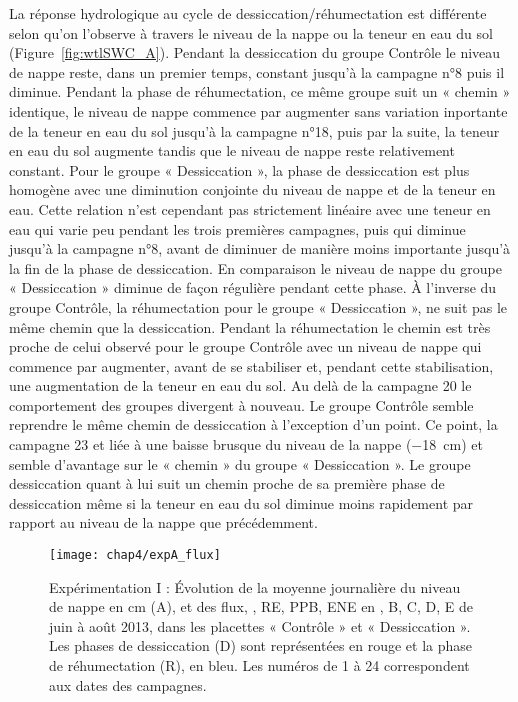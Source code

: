 La réponse hydrologique au cycle de dessiccation/réhumectation est différente selon qu'on l'observe à travers le niveau de la nappe ou la teneur en eau du sol (Figure~\ref{fig:wtlSWC_A}).
Pendant la dessiccation du groupe Contrôle le niveau de nappe reste, dans un premier temps, constant jusqu'à la campagne n°8 puis il diminue. 
Pendant la phase de réhumectation, ce même groupe suit un « chemin » identique, le niveau de nappe commence par augmenter sans variation inportante de la teneur en eau du sol jusqu'à la campagne n°18, puis par la suite, la teneur en eau du sol augmente tandis que le niveau de nappe reste relativement constant.
Pour le groupe « Dessiccation », la phase de dessiccation est plus homogène avec une diminution conjointe du niveau de nappe et de la teneur en eau.
Cette relation n'est cependant pas strictement linéaire avec une teneur en eau qui varie peu pendant les trois premières campagnes, puis qui diminue jusqu'à la campagne n°8, avant de diminuer de manière moins importante jusqu'à la fin de la phase de dessiccation.
En comparaison le niveau de nappe du groupe « Dessiccation » diminue de façon régulière pendant cette phase.
À l'inverse du groupe Contrôle, la réhumectation pour le groupe « Dessiccation », ne suit pas le même chemin que la dessiccation.
Pendant la réhumectation le chemin est très proche de celui observé pour le groupe Contrôle avec un niveau de nappe qui commence par augmenter, avant de se stabiliser et, pendant cette stabilisation, une augmentation de la teneur en eau du sol.
Au delà de la campagne 20 le comportement des groupes divergent à nouveau.
Le groupe Contrôle semble reprendre le même chemin de dessiccation à l'exception d'un point.
Ce point, la campagne 23 et liée à une baisse brusque du niveau de la nappe (\SI{-18}{\centi\metre}) et semble d'avantage sur le « chemin » du groupe « Dessiccation ».
Le groupe dessiccation quant à lui suit un chemin proche de sa première phase de dessiccation même si la teneur en eau du sol diminue moins rapidement par rapport au niveau de la nappe que précédemment.


\begin{figure}
\centering
\texttt{[image: chap4/expA\_flux]}
\caption{Expérimentation I : Évolution de la moyenne journalière du niveau de nappe en cm (A), et des flux, \chh, RE, PPB, ENE en \si{\uml}, B, C, D, E de juin à août 2013, dans les placettes « Contrôle » et « Dessiccation ». Les phases de dessiccation (D) sont représentées en rouge et la phase de réhumectation (R), en bleu. Les numéros de 1 à 24 correspondent aux dates des campagnes.}
\label{fig:HMzi}
\end{figure}

